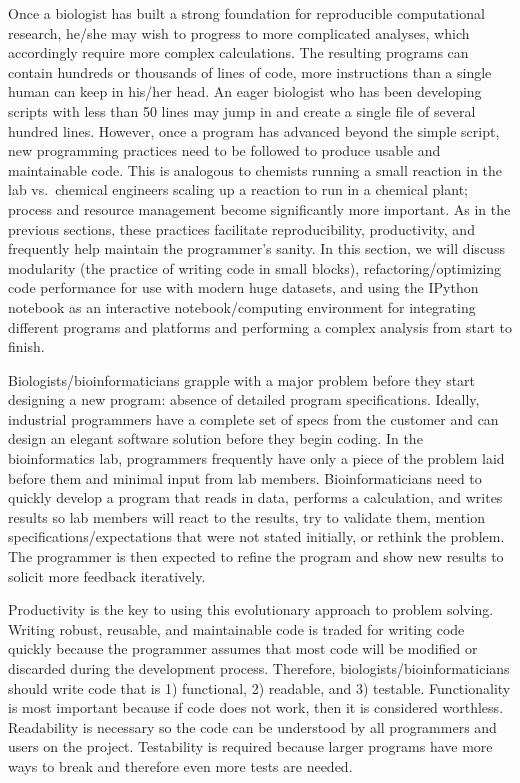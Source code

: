 \documentclass[ChapterTOCs,krantz2]{krantz} %
\begin{document}
Once a biologist has built a strong foundation for reproducible computational
research, he/she may wish to progress to more complicated analyses, which
accordingly require more complex calculations.  The resulting programs can
contain hundreds or thousands of lines of code, more instructions than a single
human can keep in his/her head.  An eager biologist who has been developing 
scripts with less than 50 lines may jump in and create a single file of
several hundred lines.  However, once a program has advanced beyond the
simple script, new programming practices need to be followed to produce usable
and maintainable code.  This is analogous to chemists running a small reaction
in the lab vs.\ chemical engineers scaling up a reaction to run in a chemical
plant; process and resource management become significantly more important.  As in the
previous sections, these practices facilitate reproducibility,
productivity, and frequently help maintain the programmer's sanity.  In this
section, we will discuss modularity (the practice of writing code in small blocks), 
refactoring/optimizing code performance for use with
modern huge datasets, and using the IPython notebook as an interactive
notebook/computing environment for integrating different programs and platforms
and performing a complex analysis from start to finish.

Biologists/bioinformaticians grapple with a major problem before they start 
designing a new program:
absence of detailed program specifications\cite{Segal2007}.  Ideally, industrial
programmers have a complete set of specs from the customer 
and can design an elegant software solution before they begin
coding.  In the bioinformatics lab, programmers frequently have only a piece of
the problem laid before them and minimal input from lab members.  
Bioinformaticians need to quickly
develop a program that reads in data, performs a calculation, and writes
results so lab members will react to the results, try to validate them, mention
specifications/expectations that were not stated initially, or
rethink the problem.  The programmer is then
expected to refine the program and show new results to
solicit more feedback iteratively. 

Productivity is the key to using this evolutionary approach to problem solving.  
Writing robust, reusable, and maintainable code is traded for
writing code quickly because the programmer assumes that most code will be
modified or discarded during the development process.  Therefore,
biologists/bioinformaticians should write code that is 1) functional, 2)
readable, and 3) testable.  Functionality is most important because if code
does not work, then it is considered worthless\cite{Kelly2008}.
Readability is necessary so the code can be understood by all programmers and users
on the project.  
Testability is required
because larger programs have more ways to break and therefore even more tests
are needed.
\end{document}
